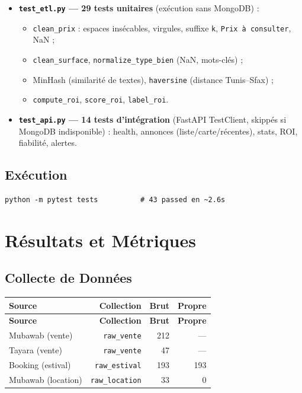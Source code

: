 \documentclass[12pt,a4paper]{report}
\begin{document}
\begin{itemize}
    \item \textbf{\texttt{test\_etl.py} — 29 tests unitaires} (exécution sans MongoDB) :
    \begin{itemize}
        \item \texttt{clean\_prix} : espaces insécables, virgules, suffixe \texttt{k}, \texttt{Prix à consulter}, NaN ;
        \item \texttt{clean\_surface}, \texttt{normalize\_type\_bien} (NaN, mots-clés) ;
        \item MinHash (similarité de textes), \texttt{haversine} (distance Tunis–Sfax) ;
        \item \texttt{compute\_roi}, \texttt{score\_roi}, \texttt{label\_roi}.
    \end{itemize}
    \item \textbf{\texttt{test\_api.py} — 14 tests d'intégration} (FastAPI TestClient, skippés si MongoDB indisponible) : health, annonces (liste/carte/récentes), stats, ROI, fiabilité, alertes.
\end{itemize}

\section{Exécution}
\begin{verbatim}
python -m pytest tests          # 43 passed en ~2.6s
\end{verbatim}

\chapter{Résultats et Métriques}

\section{Collecte de Données}

\begin{longtable}{lrrr}
\toprule
\textbf{Source} & \textbf{Collection} & \textbf{Brut} & \textbf{Propre} \\
\midrule
\endfirsthead
\toprule
\textbf{Source} & \textbf{Collection} & \textbf{Brut} & \textbf{Propre} \\
\midrule
\endhead
\bottomrule
\endfoot
Mubawab (vente) & \texttt{raw\_vente} & 212 & — \\
Tayara (vente) & \texttt{raw\_vente} & 47 & — \\
Booking (estival) & \texttt{raw\_estival} & 193 & 193 \\
Mubawab (location) & \texttt{raw\_location} & 33 & 0 \\
\bottomrule
\end{longtable}
\end{document}
